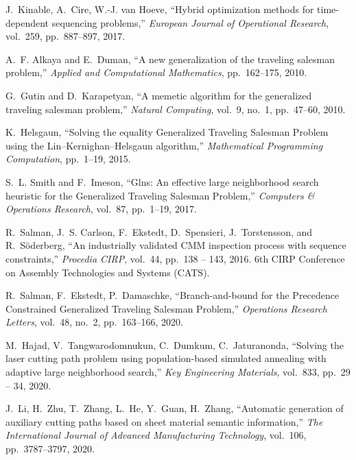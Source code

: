   \item
  J.~Kinable, A.~Cire, W.-J. van Hoeve, ``Hybrid optimization methods for
    time-dependent sequencing problems,'' {\em European Journal of Operational
    Research}, vol.~259, pp.~887--897, 2017.

  \item
  A.~F. Alkaya and E.~Duman, ``A new generalization of the traveling salesman
    problem,'' {\em Applied and Computational Mathematics}, pp.~162--175, 2010.

  \item
  G.~Gutin and D.~Karapetyan, ``A memetic algorithm for the generalized traveling
    salesman problem,'' {\em Natural Computing}, vol.~9, no.~1, pp.~47--60, 2010.

  \item
  K.~Helsgaun, ``Solving the equality {G}eneralized {T}raveling {S}alesman
    {P}roblem using the {L}in--{K}ernighan--{H}elsgaun algorithm,'' {\em
    Mathematical Programming Computation}, pp.~1--19, 2015.

  \item
  S.~L. Smith and F.~Imeson, ``Glns: An effective large neighborhood search
    heuristic for the {G}eneralized {T}raveling {S}alesman {P}roblem,'' {\em
    Computers {\&} Operations Research}, vol.~87, pp.~1--19, 2017.

  \item
  R.~Salman, J.~S. Carlson, F.~Ekstedt, D.~Spensieri, J.~Torstensson, and
    R.~S\"{o}derberg, ``An industrially validated {CMM} inspection process with
    sequence constraints,'' {\em Procedia CIRP}, vol.~44, pp.~138 -- 143, 2016.
  \newblock 6th CIRP Conference on Assembly Technologies and Systems (CATS).

  \item
  R.~Salman, F.~Ekstedt, P.~Damaschke, ``Branch-and-bound for the
    {P}recedence {C}onstrained {G}eneralized {T}raveling {S}alesman {P}roblem,''
    {\em Operations Research Letters}, vol.~48, no.~2, pp.~163--166, 2020.

  \item
  M.~Hajad, V.~Tangwarodomnukun, C.~Dumkum, C.~Jaturanonda, ``Solving the
    laser cutting path problem using population-based simulated annealing with
    adaptive large neighborhood search,'' {\em Key Engineering Materials},
    vol.~833, pp.~29 -- 34, 2020.

  \item
  J.~Li, H.~Zhu, T.~Zhang, L.~He, Y.~Guan, H.~Zhang, ``Automatic generation
    of auxiliary cutting paths based on sheet material semantic information,''
    {\em The International Journal of Advanced Manufacturing Technology},
    vol.~106, pp.~3787--3797, 2020.

